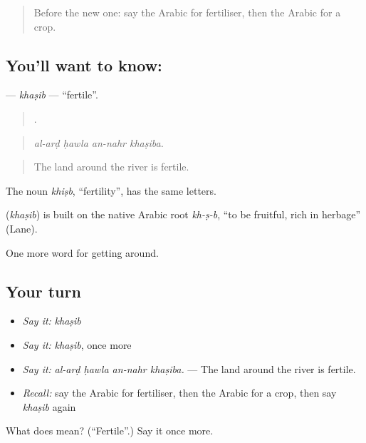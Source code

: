 \begin{quote}
Before the new one: say the Arabic for fertiliser, then the Arabic for a crop.
\end{quote}

\subsection*{You'll want to know: }
\textbf{} — \emph{khaṣib} — \textquotedblleft{}fertile\textquotedblright{}.

\begin{quote}
   .
\end{quote}

\begin{quote}
\emph{al-arḍ ḥawla an-nahr khaṣiba.}
\end{quote}

\begin{quote}
The land around the river is fertile.
\end{quote}

The noun \emph{khiṣb}, \textquotedblleft{}fertility\textquotedblright{}, has the same letters.

\begin{cousinweb}
\textbf{} (\emph{khaṣib}) is built on the native Arabic root \emph{kh-ṣ-b}, \textquotedblleft{}to be fruitful, rich in herbage\textquotedblright{} (Lane).
\end{cousinweb}

\begin{grammarlens}[title={What you've built}]
One more word for getting around.
\end{grammarlens}

\subsection*{Your turn}
\begin{itemize}
\raggedright
  \item \emph{Say it:} \emph{khaṣib}
  \item \emph{Say it:} \emph{khaṣib}, once more
  \item \emph{Say it:} \emph{al-arḍ ḥawla an-nahr khaṣiba.} — The land around the river is fertile.
  \item \emph{Recall:} say the Arabic for fertiliser, then the Arabic for a crop, then say \emph{khaṣib} again
\end{itemize}

\begin{tcolorbox}[breakable,colback=teal!4,colframe=teal!35!black,title={Before you move on}]
What does  mean? (\textquotedblleft{}Fertile\textquotedblright{}.) Say it once more.
\end{tcolorbox}

